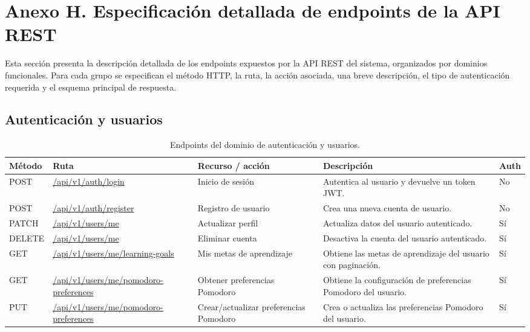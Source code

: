 \section*{Anexo H. Especificación detallada de endpoints de la API REST}
\label{anexo:endpoints}

Esta sección presenta la descripción detallada de los endpoints expuestos por la API REST
del sistema, organizados por dominios funcionales. Para cada grupo se especifican el método
HTTP, la ruta, la acción asociada, una breve descripción, el tipo de autenticación requerida
y el esquema principal de respuesta.

\subsection*{Autenticación y usuarios}

\begin{table}[H]
\centering
\footnotesize
\setlength{\tabcolsep}{4pt}
\renewcommand{\arraystretch}{1.25}
\begin{tabular}{|p{1.4cm}|p{4.1cm}|p{3.2cm}|p{5.8cm}|p{1cm}|}
\hline
\textbf{Método} & \textbf{Ruta} & \textbf{Recurso / acción} & \textbf{Descripción} & \textbf{Auth} \\
\hline

POST & \url{/api/v1/auth/login} & Inicio de sesión &
Autentica al usuario y devuelve un token JWT. &
No \\
\hline

POST & \url{/api/v1/auth/register} & Registro de usuario &
Crea una nueva cuenta de usuario. &
No \\
\hline

PATCH & \url{/api/v1/users/me} & Actualizar perfil &
Actualiza datos del usuario autenticado. &
Sí \\
\hline

DELETE & \url{/api/v1/users/me} & Eliminar cuenta &
Desactiva la cuenta del usuario autenticado. &
Sí \\
\hline

GET & \url{/api/v1/users/me/learning-goals} & Mis metas de aprendizaje &
Obtiene las metas de aprendizaje del usuario con paginación. &
Sí \\
\hline

GET & \url{/api/v1/users/me/pomodoro-preferences} & Obtener preferencias Pomodoro &
Obtiene la configuración de preferencias Pomodoro del usuario. &
Sí \\
\hline

PUT & \url{/api/v1/users/me/pomodoro-preferences} &
Crear/actualizar preferencias Pomodoro &
Crea o actualiza las preferencias Pomodoro del usuario. &
Sí \\
\hline

\end{tabular}
\caption{Endpoints del dominio de autenticación y usuarios.}
\end{table}

